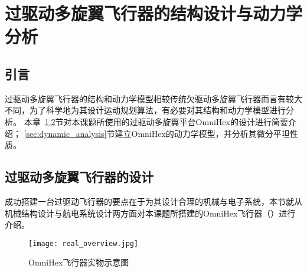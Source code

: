 
\chapter{过驱动多旋翼飞行器的结构设计与动力学分析}\label{chap:structure_and_dynamics}

\section{引言}\label{sec:intro_2}
过驱动多旋翼飞行器的结构和动力学模型相较传统欠驱动多旋翼飞行器而言有较大不同，为了科学地为其设计运动规划算法，有必要对其结构和动力学模型进行分析。
本章~\ref{sec:structure_design}节对本课题所使用的过驱动多旋翼平台OmniHex的设计进行简要介绍；
\ref{sec:dynamic_analysis}节建立OmniHex的动力学模型，并分析其微分平坦性质。

\section{过驱动多旋翼飞行器的设计}\label{sec:structure_design}
成功搭建一台过驱动飞行器的要点在于为其设计合理的机械与电子系统，本节就从机械结构设计与航电系统设计两方面对本课题所搭建的OmniHex飞行器（）进行介绍。
\begin{figure}[ht]
    \centering
    \texttt{[image: real\_overview.jpg]}
    \caption{OmniHex飞行器实物示意图}
    \label{fig:real_overview}
\end{figure}
